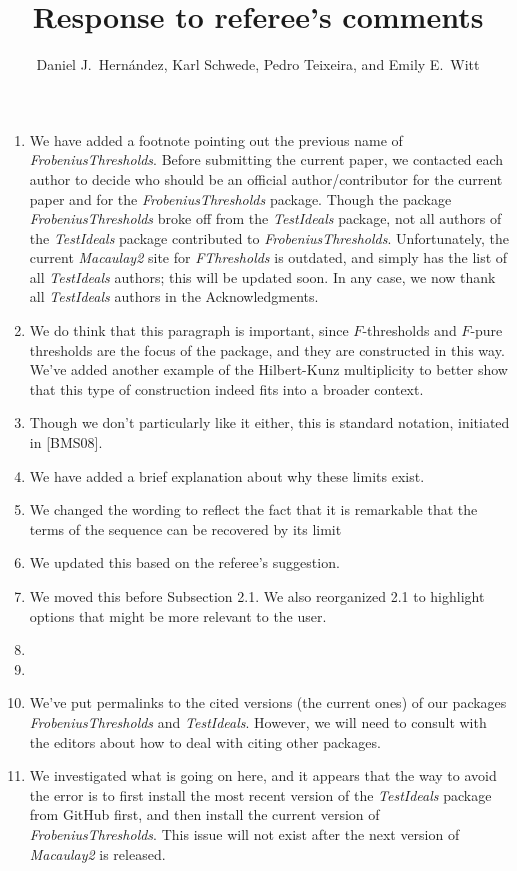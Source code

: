 \documentclass{amsart}
\begin{document}
\title{Response to referee's comments}
\author{Daniel J.\ Hern\'andez,  Karl Schwede, Pedro Teixeira, and Emily E.\ Witt}
\maketitle

\begin{enumerate}
\item We have added a footnote pointing out the previous name of \emph{FrobeniusThresholds}.  Before submitting the current paper, we contacted each author to decide who should be an official author/contributor for the current paper and for the \emph{FrobeniusThresholds} package.
Though the package \emph{FrobeniusThresholds} broke off from the \emph{TestIdeals} package, not all authors of the \emph{TestIdeals} package contributed to \emph{FrobeniusThresholds}.
Unfortunately, the current \emph{Macaulay2} site for \emph{FThresholds} is outdated, and simply has the list of all \emph{TestIdeals} authors; this will be updated soon. 
In any case, we now thank all \emph{TestIdeals} authors in the Acknowledgments. 
\item We do think that this paragraph is important, since $F$-thresholds and $F$-pure thresholds are the focus of the package, and they are constructed in this way.  We've added another example of the Hilbert-Kunz multiplicity to better show that this type of construction indeed fits into a broader context. 
\item Though we don't particularly like it either, this is standard notation, initiated in [BMS08].
\item We have added a brief explanation about why these limits exist. 
\item We changed the wording to reflect the fact that it is remarkable that the terms of the sequence can be recovered by its limit 
\item We updated this based on the referee's suggestion. 
\item We moved this before Subsection 2.1.  We also reorganized 2.1 to highlight options that might be more relevant to the user. 
\item
\item
\item We've put permalinks to the cited versions (the current ones) of our packages  \emph{FrobeniusThresholds} and \emph{TestIdeals}. 
However, we will need to consult with the editors about how to deal with citing other packages.  
\item We investigated what is going on here, and it appears that the way to avoid the error is to first install the most recent version of the \emph{TestIdeals} package from GitHub first, and then install the current version of \emph{FrobeniusThresholds}. 
This issue will not exist after the next version of \emph{Macaulay2} is released.

\end{enumerate}
\end{document}
